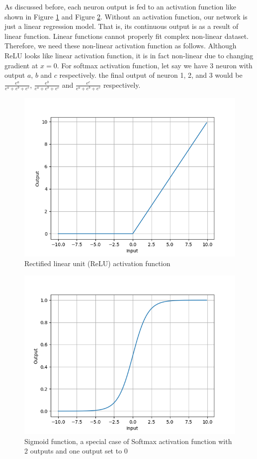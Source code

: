 As discussed before, each neuron output is fed to an activation function like shown in Figure \ref{fig:relu} and Figure \ref{fig:sigmoid}. Without an activation function, our network is just a linear regression model. That is, its continuous output is as a result of linear function. Linear functions cannot properly fit complex non-linear dataset. Therefore, we need these non-linear activation function as follows. Although ReLU looks like linear activation function, it is in fact non-linear due to changing gradient at $x=0$. For softmax activation function, let say we have 3 neuron with output $a$, $b$ and $c$ respectively. the final output of neuron 1, 2, and 3 would be $\frac{e^a}{e^a + e^b + e^c}$, $\frac{e^b}{e^a + e^b + e^c}$ and $\frac{e^c}{e^a + e^b + e^c}$ respectively.
\begin{figure}[H]
	\centering
	\includegraphics[scale=0.7]{relu.png}
	\caption{Rectified linear unit (ReLU) activation function}
	\label{fig:relu}
\end{figure}
\begin{figure}[H]
	\centering
	\includegraphics[scale=0.7]{sigmoid.png}
	\caption{Sigmoid function, a special case of Softmax activation function with 2 outputs and one output set to 0}
	\label{fig:sigmoid}
\end{figure}
